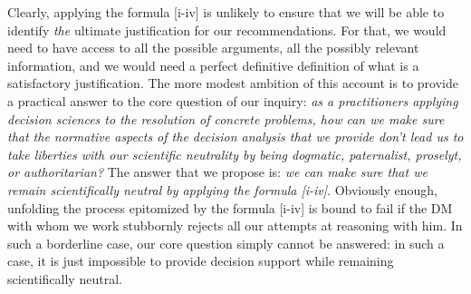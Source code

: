 \documentclass[preprint, french, english, 11pt, authoryear]{elsarticle}%
\begin{document}
Clearly, applying the formula [i-iv] is unlikely to ensure that we will be able to identify \emph{the} ultimate justification for our recommendations. For that, we would need to have access to all the possible arguments, all the possibly relevant information, and we would need a perfect definitive definition of what is a satisfactory justification.  The more modest ambition of this account is to provide a practical answer to the core question of our inquiry: \emph{as a practitioners applying decision sciences to the resolution of concrete problems, how can we make sure that the normative aspects of the decision analysis that we provide don't lead us to take liberties with our scientific neutrality by being dogmatic, paternalist, proselyt, or authoritarian?} The answer that we propose is: \emph{we can make sure that we remain scientifically neutral by applying the formula [i-iv]}. Obviously enough, unfolding the process epitomized by the formula [i-iv] is bound to fail if the \ac{DM} with whom we work stubbornly rejects all our attempts at reasoning with him. In such a borderline case, our core question simply cannot be answered: in such a case, it is just impossible to provide decision support while remaining scientifically neutral.
\end{document}
